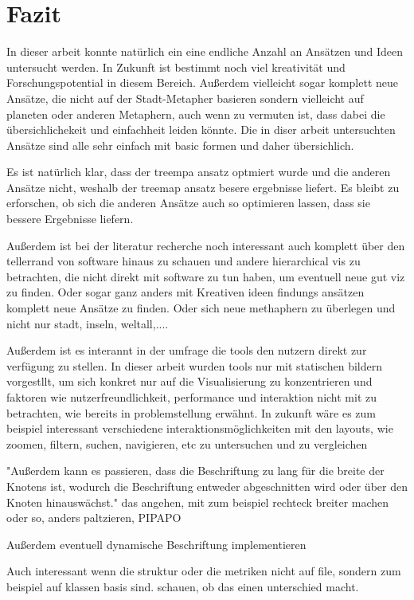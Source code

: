 \chapter{Fazit} \label{sec:Fazit}
In dieser arbeit konnte natürlich ein eine endliche Anzahl an Ansätzen und Ideen untersucht werden. In Zukunft ist bestimmt noch viel kreativität und Forschungspotential in diesem Bereich. Außerdem vielleicht sogar komplett neue Ansätze, die nicht auf der Stadt-Metapher basieren sondern vielleicht auf planeten oder anderen Metaphern, auch wenn zu vermuten ist, dass dabei die übersichlichekeit und einfachheit leiden könnte. Die in diser arbeit untersuchten Ansätze sind alle sehr einfach mit basic formen und daher übersichlich.


Es ist natürlich klar, dass der treempa ansatz optmiert wurde und die anderen Ansätze nicht, weshalb der treemap ansatz besere ergebnisse liefert. 
Es bleibt zu erforschen, ob sich die anderen Ansätze auch so optimieren lassen, dass sie bessere Ergebnisse liefern.


Außerdem ist bei der literatur recherche noch interessant auch komplett über den tellerrand von software hinaus zu schauen und andere hierarchical vis zu betrachten, die nicht direkt mit software zu tun haben, um eventuell neue gut viz zu finden. Oder sogar ganz anders mit Kreativen ideen findungs ansätzen komplett neue Ansätze zu finden. Oder sich neue methaphern zu überlegen und nicht nur stadt, inseln, weltall,....

Außerdem ist es interannt in der umfrage die tools den nutzern direkt zur verfügung zu stellen. In dieser arbeit wurden tools nur mit statischen bildern vorgestllt, um sich konkret nur auf die Visualisierung zu konzentrieren und faktoren wie nutzerfreundlichkeit, performance und interaktion nicht mit zu betrachten, wie bereits in problemstellung erwähnt. In zukunft wäre es zum beispiel interessant verschiedene interaktionsmöglichkeiten mit den layouts, wie zoomen, filtern, suchen, navigieren, etc zu untersuchen und zu vergleichen

"Außerdem kann es passieren, dass die Beschriftung zu lang für die breite der Knotens ist, wodurch die Beschriftung entweder abgeschnitten wird oder über den Knoten hinauswächst." das angehen, mit zum beispiel rechteck breiter machen oder so, anders paltzieren, PIPAPO

Außerdem eventuell dynamische Beschriftung implementieren


Auch interessant wenn die struktur oder die metriken nicht auf file, sondern zum beispiel auf klassen basis sind. schauen, ob das einen unterschied macht.



